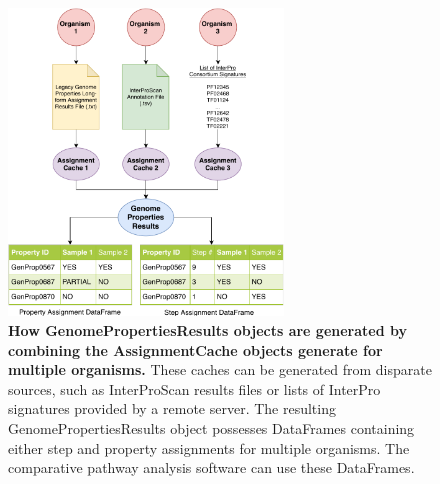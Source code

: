 \begin{figure}[!ht]
  \centering
	\includegraphics[width=0.65\textwidth]{media/assignment_results_overview.pdf}
	 \caption[How GenomePropertiesResults objects are generated by combining the 
AssignmentCache objects generate for multiple 
organisms.]{\textbf{How GenomePropertiesResults objects are generated by combining the 
AssignmentCache objects generate for multiple organisms.} These caches can be 
generated from disparate sources, such as InterProScan results files or lists of 
InterPro signatures provided by a remote server. The resulting 
GenomePropertiesResults object possesses DataFrames containing either step and 
property assignments for multiple organisms. The comparative pathway analysis 
software can use these DataFrames.}
	 \label{fig:resultscreation}
\end{figure}

